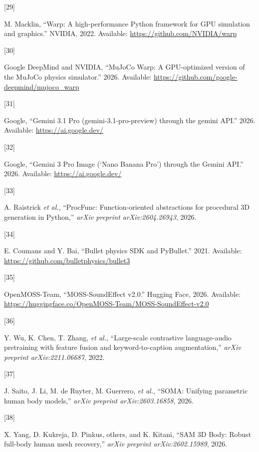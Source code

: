 \documentclass[
  11pt,
]{article}
\newlength{\cslhangindent}
\newlength{\csllabelwidth}
\newenvironment{CSLReferences}[2] %
 {\begin{list}{}{%
  \setlength{\itemindent}{0pt}
  \setlength{\leftmargin}{0pt}
  \setlength{\parsep}{0pt}
  \ifodd #1
   \setlength{\leftmargin}{\cslhangindent}
   \setlength{\itemindent}{-1\cslhangindent}
  \fi
  \setlength{\itemsep}{#2\baselineskip}}}
 {\end{list}}
\newcommand{\CSLLeftMargin}[1]{\parbox[t]{\csllabelwidth}{\strut#1\strut}}
\newcommand{\CSLRightInline}[1]{\parbox[t]{\linewidth - \csllabelwidth}{\strut#1\strut}}
\begin{document}
\begin{CSLReferences}{0}{0}
\CSLLeftMargin{{[}29{]} }%
\CSLRightInline{M. Macklin, {``{Warp}: A high-performance {Python}
framework for {GPU} simulation and graphics.''} NVIDIA, 2022. Available:
\url{https://github.com/NVIDIA/warp}}

\CSLLeftMargin{{[}30{]} }%
\CSLRightInline{Google DeepMind and NVIDIA, {``{MuJoCo Warp}: A
{GPU}-optimized version of the {MuJoCo} physics simulator.''} 2026.
Available: \url{https://github.com/google-deepmind/mujoco_warp}}

\CSLLeftMargin{{[}31{]} }%
\CSLRightInline{Google, {``{Gemini 3.1 Pro} (gemini-3.1-pro-preview)
through the gemini {API}.''} 2026. Available:
\url{https://ai.google.dev/}}

\CSLLeftMargin{{[}32{]} }%
\CSLRightInline{Google, {``{Gemini 3 Pro Image ({`Nano Banana Pro'})
through the Gemini {API}}.''} 2026. Available:
\url{https://ai.google.dev/}}

\CSLLeftMargin{{[}33{]} }%
\CSLRightInline{A. Raistrick \emph{et al.}, {``{ProcFunc}:
Function-oriented abstractions for procedural {3D} generation in
{Python},''} \emph{arXiv preprint arXiv:2604.26943}, 2026.}

\CSLLeftMargin{{[}34{]} }%
\CSLRightInline{E. Coumans and Y. Bai, {``{Bullet} physics {SDK} and
{PyBullet}.''} 2021. Available:
\url{https://github.com/bulletphysics/bullet3}}

\CSLLeftMargin{{[}35{]} }%
\CSLRightInline{OpenMOSS-Team, {``{MOSS-SoundEffect} v2.0.''} Hugging
Face, 2026. Available:
\url{https://huggingface.co/OpenMOSS-Team/MOSS-SoundEffect-v2.0}}

\CSLLeftMargin{{[}36{]} }%
\CSLRightInline{{Y. Wu, K. Chen, T. Zhang, \emph{et al.}},
{``Large-scale contrastive language-audio pretraining with feature
fusion and keyword-to-caption augmentation,''} \emph{arXiv preprint
arXiv:2211.06687}, 2022.}

\CSLLeftMargin{{[}37{]} }%
\CSLRightInline{{J. Saito, J. Li, M. de Ruyter, M. Guerrero, \emph{et
al.}}, {``{SOMA}: Unifying parametric human body models,''} \emph{arXiv
preprint arXiv:2603.16858}, 2026.}

\CSLLeftMargin{{[}38{]} }%
\CSLRightInline{{X. Yang, D. Kukreja, D. Pinkus, others, and K. Kitani},
{``{SAM 3D Body}: Robust full-body human mesh recovery,''} \emph{arXiv
preprint arXiv:2602.15989}, 2026.}


\end{CSLReferences}
\end{document}

